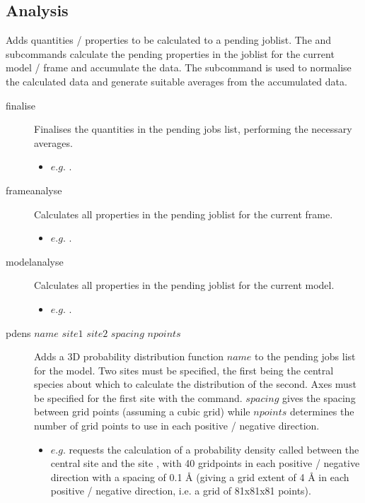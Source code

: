 \subsection{Analysis}
Adds quantities / properties to be calculated to a pending joblist. The  and  subcommands calculate the pending properties in the joblist for the current model / frame and accumulate the data. The  subcommand is used to normalise the calculated data and generate suitable averages from the accumulated data.\\
\begin{description}

	\item[finalise\its] Finalises the quantities in the pending jobs list, performing the necessary averages.
	\begin{itemize}
		\item $e.g.$ .
	\end{itemize}

	\item[frameanalyse\its] Calculates all properties in the pending joblist for the current frame.
	\begin{itemize}
		\item $e.g.$ .
	\end{itemize}

	\item[modelanalyse\its] Calculates all properties in the pending joblist for the current model.
	\begin{itemize}
		\item $e.g.$ .
	\end{itemize}

	\item[pdens $name$ $site1$ $site2$ $spacing$ $npoints$\its] Adds a 3D probability distribution function $name$ to the pending jobs list for the model. Two sites must be specified, the first being the central species about which to calculate the distribution of the second. Axes must be specified for the first site with the  command. $spacing$ gives the spacing between grid points (assuming a cubic grid) while $npoints$ determines the number of grid points to use in each positive / negative direction.
	\begin{itemize}
		\item $e.g.$  requests the calculation of a probability density called  between the central site  and the site , with 40 gridpoints in each positive / negative direction with a spacing of 0.1 \AA{} (giving a grid extent of 4 \AA{} in each positive / negative direction, i.e. a grid of 81x81x81 points).
	\end{itemize}


\end{description}
